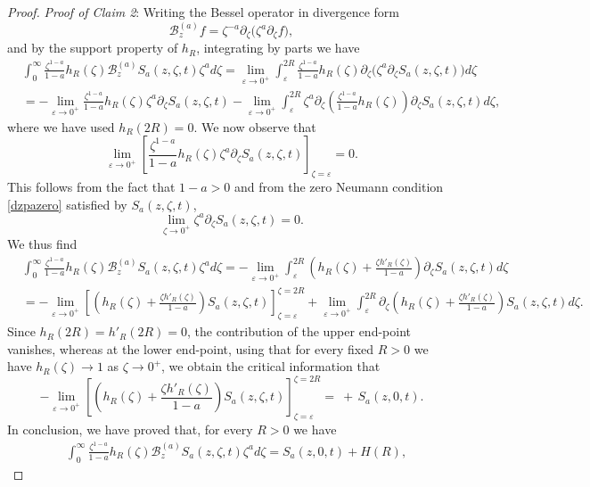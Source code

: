 \documentclass[11pt,letter]{amsart}
\newcommand{\Ba}{\mathscr B_z^{(a)}}
\newcommand{\p}{\partial}
\numberwithin{equation}{section}
\newcommand{\ve}{\varepsilon}
\numberwithin{equation}{section}
\begin{document}
\begin{proof}
\noindent \emph{Proof of Claim 2}:
Writing the Bessel operator in divergence form
\[
\Ba f
= \zeta^{-a}\partial_\zeta \big(\zeta^a \partial_\zeta f\big),
\]
and by the support property of $h_R$, integrating by parts we have
\begin{align*}
& \int_0^\infty
\frac{\zeta^{1-a}}{1-a}
h_R(\zeta)
\Ba S_a(z,\zeta,t) \zeta^a d\zeta = \underset{\ve\to 0^+}{\lim} \int_\ve^{2R}
\frac{\zeta^{1-a}}{1-a}
h_R(\zeta) \partial_\zeta \big(\zeta^a \partial_\zeta S_a(z,\zeta,t)\big) d\zeta
\\
& = - \underset{\ve\to 0^+}{\lim} \frac{\zeta^{1-a}}{1-a}
h_R(\zeta) \zeta^a \partial_\zeta S_a(z,\zeta,t) - \underset{\ve\to 0^+}{\lim} \int_\ve^{2R}
\zeta^a \p_\zeta\left(\frac{\zeta^{1-a}}{1-a}
h_R(\zeta)\right)  \partial_\zeta S_a(z,\zeta,t) d\zeta,
\end{align*}
where we have used $h_R(2R) = 0$. We now observe that 
\[
\underset{\ve\to 0^+}{\lim} \left[\frac{\zeta^{1-a}}{1-a}
h_R(\zeta) \zeta^a \partial_\zeta S_a(z,\zeta,t)\right]_{\zeta=\ve} =0.
\]
This follows from the fact that $1-a>0$ and from the zero Neumann condition \eqref{dzpazero} satisfied by $S_a(z,\zeta,t)$,
\[
\underset{\zeta\to 0^+}{\lim}  \zeta^a \partial_\zeta S_a(z,\zeta,t) =0.
\]
We thus find
\begin{align*}
& \int_0^\infty
\frac{\zeta^{1-a}}{1-a}
h_R(\zeta)
\Ba S_a(z,\zeta,t) \zeta^a d\zeta = - \underset{\ve\to 0^+}{\lim} \int_\ve^{2R} \left(h_R(\zeta) + \frac{\zeta h'_R(\zeta)}{1-a} \right) \partial_\zeta S_a(z,\zeta,t)d\zeta
\\
& = - \underset{\ve\to 0^+}{\lim} \left[\left(h_R(\zeta) + \frac{\zeta h'_R(\zeta)}{1-a} \right) S_a(z,\zeta,t)\right]_{\zeta = \ve}^{\zeta = 2R} + \underset{\ve\to 0^+}{\lim} \int_\ve^{2R} \p_\zeta \left(h_R(\zeta) + \frac{\zeta h'_R(\zeta)}{1-a} \right)  S_a(z,\zeta,t) d\zeta.
\end{align*}
Since $h_R(2R) = h'_R(2R) = 0$, the contribution of the upper end-point vanishes, whereas at the lower end-point, using that for every fixed $R>0$ we have $h_R(\zeta)\to 1$ as $\zeta\to 0^+$, we obtain the critical information that 
\[
- \underset{\ve\to 0^+}{\lim} \left[\left(h_R(\zeta) + \frac{\zeta h'_R(\zeta)}{1-a} \right) S_a(z,\zeta,t)\right]_{\zeta = \ve}^{\zeta = 2R} =\ +\, S_a(z,0,t).
\]
In conclusion, we have proved that, for every $R>0$ we have
\begin{align}\label{key}
& \int_0^\infty
\frac{\zeta^{1-a}}{1-a}
h_R(\zeta)
\Ba S_a(z,\zeta,t) \zeta^a d\zeta =  S_a(z,0,t) + H(R),
\end{align}

\end{proof}
\end{document}
